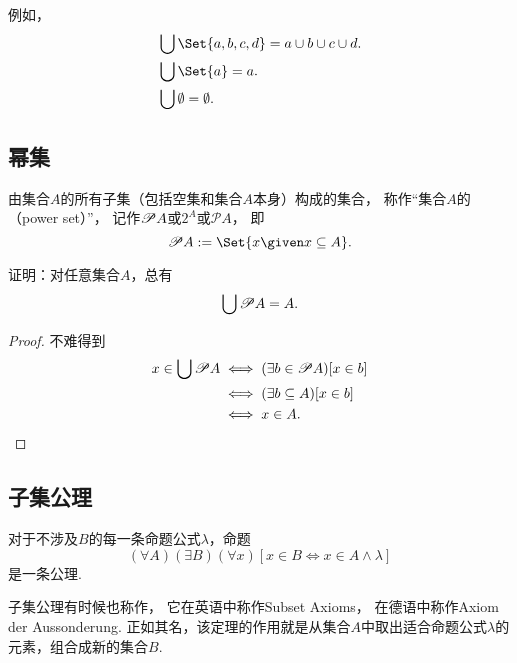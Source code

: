 例如，
\begin{align*}
	&\bigcup\Set{a,b,c,d} = a \cup b \cup c \cup d. \\
	&\bigcup\Set{a} = a. \\
	&\bigcup\emptyset = \emptyset.
\end{align*}


\subsection{幂集}
\begin{definition}
由集合\(A\)的所有子集（包括空集和集合\(A\)本身）构成的集合，
称作“集合\(A\)的（power set）”，
记作\(\mathscr{P} A\)或\(2^A\)或\(\mathcal{P}A\)，
即\begin{equation*}
	\Powerset A
	\defeq
	\Set{ x \given x \subseteq A }.
\end{equation*}
\end{definition}

\begin{example}
证明：对任意集合\(A\)，总有
\begin{equation}\label{equation:集合论.集的幂集的并等于集}
	\bigcup \mathscr{P} A = A.
\end{equation}
\begin{proof}
不难得到
\begin{align*}
	x \in \bigcup \mathscr{P} A
	&\iff
	(\exists b \in \mathscr{P} A)
	[x \in b] \\
	&\iff
	(\exists b \subseteq A)
	[x \in b] \\
	&\iff
	x \in A.
	\qedhere
\end{align*}
\end{proof}
\end{example}

\subsection{子集公理}
\begin{axiom}[子集公理]
对于不涉及\(B\)的每一条命题公式\(\lambda\)，命题\begin{equation*}
	(\forall A)(\exists B)(\forall x)
	[x \in B \iff x \in A \land \lambda]
\end{equation*}是一条公理.
\end{axiom}
子集公理有时候也称作，
它在英语中称作Subset Axioms，
在德语中称作Axiom der Aussonderung.
正如其名，该定理的作用就是从集合\(A\)中取出适合命题公式\(\lambda\)的元素，组合成新的集合\(B\).

